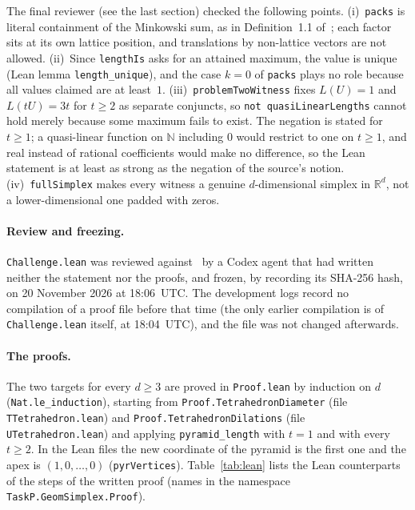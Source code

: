 \documentclass[11pt]{article}
\theoremstyle{definition}
\theoremstyle{remark}
\newcommand{\R}{\mathbb R}
\newcommand{\N}{\mathbb N}
\begin{document}
{The final reviewer (see the last section) checked the following points.
(i)~\texttt{packs} is literal containment of the Minkowski sum, as in
Definition~1.1 of~\cite{ss}; each factor sits at its own lattice position,
and translations by non-lattice vectors are not allowed. (ii)~Since
\texttt{lengthIs} asks for an attained maximum, the value is unique (Lean
lemma \texttt{length\_\allowbreak unique}), and the case $k=0$ of
\texttt{packs} plays no role because all values claimed are at least~$1$.
(iii)~\texttt{problemTwoWitness} fixes $L(U)=1$ and $L(tU)=3t$ for $t\ge2$ as
separate conjuncts, so \texttt{not quasiLinearLengths} cannot hold merely
because some maximum fails to exist. The negation is stated for $t\ge1$; a
quasi-linear function on $\N$ including $0$ would restrict to one on $t\ge1$,
and real instead of rational coefficients would make no difference, so the
Lean statement is at least as strong as the negation of the source's notion.
(iv)~\texttt{fullSimplex} makes every witness a genuine $d$-dimensional
simplex in $\R^d$, not a lower-dimensional one padded with zeros.

\paragraph{Review and freezing.}
\texttt{Challenge.lean} was reviewed against~\cite{ss} by a Codex agent that
had written neither the statement nor the proofs, and frozen, by recording its
SHA-256 hash, on 20 November 2026 at 18:06~UTC. The development logs record no
compilation of a proof file before that time (the only earlier compilation is
of \texttt{Challenge.lean} itself, at 18:04~UTC), and the file was not changed
afterwards.

\paragraph{The proofs.}
The two targets for every $d\ge3$ are proved in \texttt{Proof.lean} by
induction on $d$ (\texttt{Nat.le\_\allowbreak induction}), starting from
\texttt{Proof.TetrahedronDiameter} (file \texttt{TTetrahedron.lean}) and
\texttt{Proof.TetrahedronDilations} (file \texttt{UTetrahedron.lean}) and
applying \texttt{pyramid\_\allowbreak length} with $t=1$ and with every
$t\ge2$. In the Lean files the new coordinate of the pyramid is the first one
and the apex is $(1,0,\dots,0)$ (\texttt{pyrVertices}).
Table~\ref{tab:lean} lists the Lean counterparts of the steps of the written
proof (names in the namespace \texttt{TaskP.GeomSimplex.Proof}).

}
\end{document}
